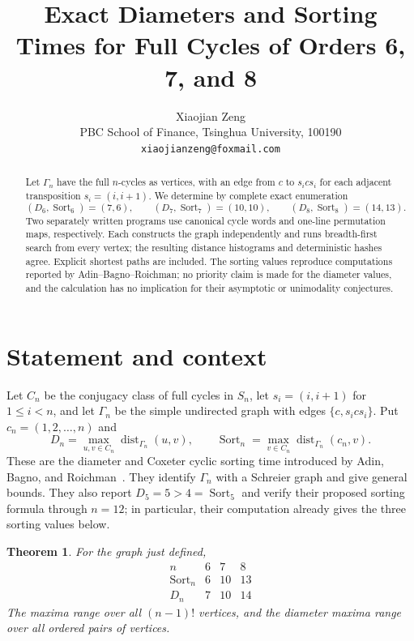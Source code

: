 \documentclass[11pt]{article}
\title{Exact Diameters and Sorting Times for Full Cycles of Orders 6, 7, and 8}
\author{Xiaojian Zeng\\
PBC School of Finance, Tsinghua University, 100190\\
\texttt{xiaojianzeng@foxmail.com}}
\date{}
\newtheorem{theorem}{Theorem}
\newcommand{\Sort}{\operatorname{Sort}}
\newcommand{\dist}{\operatorname{dist}}
\begin{document}
\maketitle

\begin{abstract}
Let $\Gamma_n$ have the full $n$-cycles as vertices, with an edge from $c$ to
$s_i c s_i$ for each adjacent transposition $s_i=(i,i+1)$.  We determine by
complete exact enumeration
\[
 (D_6,\Sort_6)=(7,6),\qquad (D_7,\Sort_7)=(10,10),\qquad
 (D_8,\Sort_8)=(14,13).
\]
Two separately written programs use canonical cycle words and one-line
permutation maps, respectively.  Each constructs the graph independently and
runs breadth-first search from every vertex; the resulting distance
histograms and deterministic hashes agree.  Explicit shortest paths are
included.  The sorting values reproduce computations reported by
Adin--Bagno--Roichman; no priority claim is made for the diameter values, and
the calculation has no implication for their asymptotic or unimodality
conjectures.
\end{abstract}

\section{Statement and context}

Let $C_n$ be the conjugacy class of full cycles in $S_n$, let
$s_i=(i,i+1)$ for $1\leq i<n$, and let $\Gamma_n$ be the simple undirected
graph with edges $\{c,s_i c s_i\}$.  Put $c_n=(1,2,\ldots,n)$ and
\[
 D_n=\max_{u,v\in C_n}\dist_{\Gamma_n}(u,v),\qquad
 \Sort_n=\max_{v\in C_n}\dist_{\Gamma_n}(c_n,v).
\]
These are the diameter and Coxeter cyclic sorting time introduced by
Adin, Bagno, and Roichman~\cite{AdinBagnoRoichman2026}.  They identify
$\Gamma_n$ with a Schreier graph and give general bounds.  They also report
$D_5=5>4=\Sort_5$ and verify their proposed sorting formula through $n=12$;
in particular, their computation already gives the three sorting values below.

\begin{theorem}\label{thm:main}
For the graph just defined,
\[
\begin{array}{c|ccc}
n&6&7&8\\ \hline
\Sort_n&6&10&13\\
D_n&7&10&14
\end{array}
\]
The maxima range over all $(n-1)!$ vertices, and the diameter maxima range over
all ordered pairs of vertices.
\end{theorem}
\end{document}
